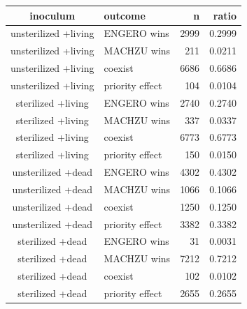 \begin{table}[t]
\fontsize{12.0pt}{14.4pt}\selectfont
\begin{tabular*}{\linewidth}{@{\extracolsep{\fill}}clrr}
\toprule
inoculum & outcome & n & ratio \\ 
\midrule\addlinespace[2.5pt]
unsterilized
+living & ENGERO wins & 2999 & 0.2999 \\ 
unsterilized
+living & MACHZU wins & 211 & 0.0211 \\ 
unsterilized
+living & coexist & 6686 & 0.6686 \\ 
unsterilized
+living & priority effect & 104 & 0.0104 \\ 
sterilized
+living & ENGERO wins & 2740 & 0.2740 \\ 
sterilized
+living & MACHZU wins & 337 & 0.0337 \\ 
sterilized
+living & coexist & 6773 & 0.6773 \\ 
sterilized
+living & priority effect & 150 & 0.0150 \\ 
unsterilized
+dead & ENGERO wins & 4302 & 0.4302 \\ 
unsterilized
+dead & MACHZU wins & 1066 & 0.1066 \\ 
unsterilized
+dead & coexist & 1250 & 0.1250 \\ 
unsterilized
+dead & priority effect & 3382 & 0.3382 \\ 
sterilized
+dead & ENGERO wins & 31 & 0.0031 \\ 
sterilized
+dead & MACHZU wins & 7212 & 0.7212 \\ 
sterilized
+dead & coexist & 102 & 0.0102 \\ 
sterilized
+dead & priority effect & 2655 & 0.2655 \\ 
\bottomrule
\end{tabular*}
\end{table}


